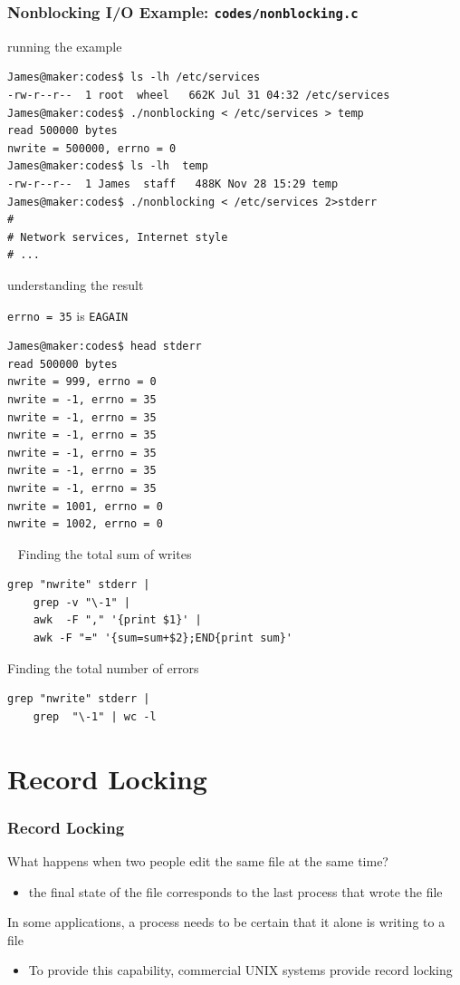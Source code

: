 \documentclass[newPxFont,sthlmFooter,nooffset]{beamer}
\begin{document}
\begin{frame}
  \frametitle{Nonblocking I/O Example: \texttt{codes/nonblocking.c}}

  



running the example
{\footnotesize
\begin{verbatim}
James@maker:codes$ ls -lh /etc/services
-rw-r--r--  1 root  wheel   662K Jul 31 04:32 /etc/services
James@maker:codes$ ./nonblocking < /etc/services > temp
read 500000 bytes
nwrite = 500000, errno = 0
James@maker:codes$ ls -lh  temp
-rw-r--r--  1 James  staff   488K Nov 28 15:29 temp
James@maker:codes$ ./nonblocking < /etc/services 2>stderr
#
# Network services, Internet style
# ...
\end{verbatim}
}


understanding the result

\texttt{errno = 35} is \texttt{EAGAIN}
\begin{verbatim}
James@maker:codes$ head stderr
read 500000 bytes
nwrite = 999, errno = 0
nwrite = -1, errno = 35
nwrite = -1, errno = 35
nwrite = -1, errno = 35
nwrite = -1, errno = 35
nwrite = -1, errno = 35
nwrite = -1, errno = 35
nwrite = 1001, errno = 0
nwrite = 1002, errno = 0
\end{verbatim}

\bigskip
~
\bigskip
Finding the total sum of writes
\begin{verbatim}
grep "nwrite" stderr | 
    grep -v "\-1" |
    awk  -F "," '{print $1}' | 
    awk -F "=" '{sum=sum+$2};END{print sum}'
\end{verbatim}

\bigskip

Finding the total number of errors
\begin{verbatim}
grep "nwrite" stderr | 
    grep  "\-1" | wc -l
\end{verbatim}

\end{frame}

\section{Record Locking}

\begin{frame}[t]
  \frametitle{Record Locking}
What happens when two people edit the same file at the same time?
\begin{itemize}
\item the final state of the file corresponds to the last process that wrote the file
\end{itemize}

In some applications, a process needs to be certain that it alone is writing to a file
\begin{itemize}
\item To provide this capability, commercial UNIX systems provide record locking
\end{itemize}
\end{frame}
\end{document}

